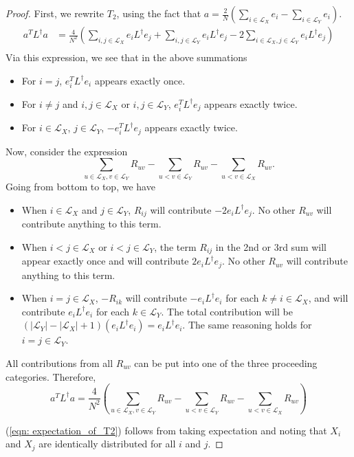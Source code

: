 \documentclass{article}
\newcommand{\abs}[1]{\left \lvert #1 \right \rvert}
\newcommand{\Linv}{L^{\dagger}}
\newcommand{\Lx}{\mathcal{L}_X}
\newcommand{\Ly}{\mathcal{L}_Y}
\theoremstyle{alden}
\theoremstyle{definition}
\theoremstyle{remark}
\begin{document}
\begin{proof}
	First, we rewrite $T_2$, using the fact that $a = \frac{2}{N} \left(\sum_{i \in \Lx} e_i - \sum_{i \in \Ly} e_i \right)$. 
	\begin{align*}
	a^T \Linv a & = \frac{4}{N^2} \left(\sum_{i, j \in \Lx }e_i \Linv e_j + \sum_{i, j \in \Ly }e_i \Linv e_j - 2\sum_{i \in \Lx, j \in \Ly} e_i \Linv e_j \right)\\
	\end{align*}
	Via this expression, we see that in the above summations
	\begin{itemize}
		\item For $i = j$, $e_i^T \Linv e_i$ appears exactly once.
		\item For $i \neq  j$ and $i, j \in \Lx$ or $i,j \in \Ly$, $e_i^T \Linv e_j$ appears exactly twice.
		\item For $i \in \Lx$, $j \in \Ly$, $- e_i^T \Linv e_j$ appears exactly twice.
	\end{itemize}

	Now, consider the expression
	\begin{equation*}
	 \sum_{u \in \Lx, v \in \Ly} R_{uv} - \sum_{u < v \in \Ly }R_{uv} - \sum_{u < v \in \Lx }R_{uv}.
	\end{equation*}
	Going from bottom to top, we have
	\begin{itemize}
		\item When $i \in \Lx$ and $j \in \Ly$, $R_{ij}$ will contribute $-2 e_i \Linv e_j$. No other $R_{uv}$ will contribute anything to this term.
		\item When $i < j \in \Lx$ or $i < j \in \Ly$, the term $R_{ij}$ in the 2nd or 3rd sum will appear exactly once and will contribute $2 e_i \Linv e_j$. No other $R_{uv}$ will contribute anything to this term.
		\item When $i = j \in \Lx$, $- R_{ik}$ will contribute $ - e_i \Linv e_i$ for each $k \neq i \in \Lx$, and will contribute $ e_i \Linv e_i$ for each $k \in \Ly$. The total contribution will be $ \left(\abs{\Ly} - \abs{\Lx} + 1\right) (e_i \Linv e_i) = e_i \Linv e_i$. The same reasoning holds for $i = j \in \Ly$. 
	\end{itemize}

	All contributions from all $R_{uv}$ can be put into one of the three proceeding categories. Therefore,
	\begin{equation*}
	a^T \Linv a = \frac{4}{N^2} \left(\sum_{u \in \Lx, v \in \Ly} R_{uv} - \sum_{u < v \in \Ly }R_{uv} - \sum_{u < v \in \Lx }R_{uv}\right)
	\end{equation*}
	
	(\ref{eqn: expectation_of_T2}) follows from taking expectation and noting that $X_i$ and $X_j$ are identically distributed for all $i$ and $j$. 
	
\end{proof}
\end{document}
